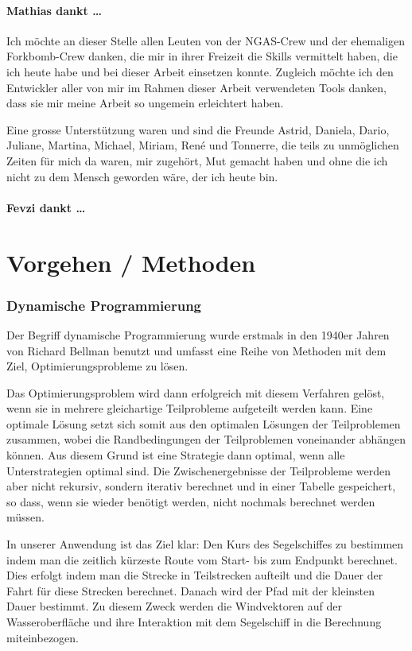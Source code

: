 \documentclass[a4paper,10pt]{article}
\begin{document}
\subsection{Mathias dankt \dots}
Ich möchte an dieser Stelle allen Leuten von der NGAS-Crew und der ehemaligen
Forkbomb-Crew danken, die mir in ihrer Freizeit die Skills vermittelt haben,
die ich heute habe und bei dieser Arbeit einsetzen konnte. Zugleich möchte ich
den Entwickler aller von mir im Rahmen dieser Arbeit verwendeten Tools danken,
dass sie mir meine Arbeit so ungemein erleichtert haben.

Eine grosse Unterstützung waren und sind die Freunde Astrid, Daniela, Dario,
Juliane, Martina, Michael, Miriam, René und Tonnerre, die teils zu unmöglichen
Zeiten für mich da waren, mir zugehört, Mut gemacht haben und ohne die ich
nicht zu dem Mensch geworden wäre, der ich heute bin.

\subsection{Fevzi dankt \dots}

\newpage
\part{Vorgehen / Methoden}
\section{Dynamische Programmierung}
Der Begriff dynamische Programmierung wurde erstmals in den 1940er Jahren von
Richard Bellman benutzt und umfasst eine Reihe von Methoden mit dem Ziel,
Optimierungsprobleme zu lösen. 

Das Optimierungsproblem wird dann erfolgreich mit diesem Verfahren
gelöst, wenn sie in mehrere gleichartige Teilprobleme aufgeteilt werden
kann. Eine optimale Lösung setzt sich somit aus den optimalen Lösungen
der Teilproblemen zusammen, wobei die Randbedingungen der Teilproblemen
voneinander abhängen können.  Aus diesem Grund ist eine Strategie dann
optimal, wenn alle Unterstrategien optimal sind. Die Zwischenergebnisse
der Teilprobleme werden aber nicht rekursiv, sondern iterativ berechnet
und in einer Tabelle gespeichert, so dass, wenn sie wieder benötigt
werden, nicht nochmals berechnet werden müssen.

In unserer Anwendung ist das Ziel klar: Den Kurs des Segelschiffes zu
bestimmen indem man die zeitlich kürzeste Route vom Start- bis zum
Endpunkt berechnet. Dies erfolgt indem man die Strecke in Teilstrecken
aufteilt und die Dauer der Fahrt für diese Strecken berechnet. Danach
wird der Pfad mit der kleinsten Dauer bestimmt. Zu diesem Zweck werden
die Windvektoren auf der Wasseroberfläche und ihre Interaktion mit dem
Segelschiff in die Berechnung miteinbezogen. 
\end{document}
